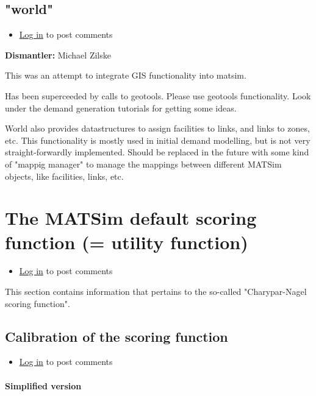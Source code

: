 \documentclass[a4paper,11pt]{report}
\begin{document}
\vfill\eject
\section{"world"}
\begin{itemize}
	\item \href{http://www.matsim.org/user/login?destination=comment/reply/403%23comment-form}{Log in} to post comments
\end{itemize}

\textbf{Dismantler:} Michael Zilske

This was an attempt to integrate GIS functionality into matsim.

Has been superceeded by calls to geotools. Please use geotools  functionality. Look under the demand generation tutorials for  getting some ideas.

World also provides datastructures to assign facilities to links, and  links to zones, etc. This functionality is mostly used in initial  demand modelling, but is not very straight-forwardly implemented. Should  be replaced in the future with some kind of "mappig manager" to manage  the mappings between different MATSim objects, like facilities, links,  etc.

\chapter{The MATSim default scoring function (= utility function)}
\begin{itemize}
	\item \href{http://www.matsim.org/user/login?destination=comment/reply/325%23comment-form}{Log in} to post comments
\end{itemize}

This section contains information that pertains to the so-called "Charypar-Nagel scoring function".

\vfill\eject
\section{Calibration of the scoring function}
\begin{itemize}
	\item \href{http://www.matsim.org/user/login?destination=comment/reply/650%23comment-form}{Log in} to post comments
\end{itemize}

\subsubsection{Simplified version}
\end{document}
